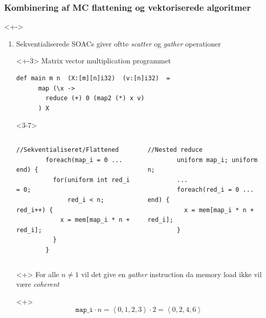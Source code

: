 \documentclass[t]{beamer}
\begin{document}
\begin{frame}[fragile]
  \frametitle{Kombinering af MC flattening og vektoriserede algoritmer}
  <+->
  \begin{enumerate}
    \item<+-> Sekventialiserede SOACs giver oftte \textit{scatter} og \textit{gather} operationer\\
      \begin{onlyenv}<+-3>
        Matrix vector multiplication programmet
        \begin{lstlisting}[language=futhark]
    def main m n  (X:[m][n]i32)  (v:[n]i32)  =
      map (\x ->
        reduce (+) 0 (map2 (*) x v)
      ) X
\end{lstlisting}
      \end{onlyenv}
      \begin{onlyenv}<3-7>
      \begin{columns}
        \begin{column}{0.49\textwidth}
        \begin{lstlisting}[language=ispc, xleftmargin=-15mm, breaklines=false]
        //Sekventialiseret/Flattened
        foreach(map_i = 0 ... end) {
          for(uniform int red_i = 0;
              red_i < n; red_i++) {
            x = mem[map_i * n + red_i];
          }
        }
\end{lstlisting}
        \end{column}
        \begin{column}{0.49\textwidth}
        \begin{lstlisting}[language=ispc, xleftmargin=-15mm, breaklines=false]
        //Nested reduce
        uniform map_i; uniform n;
        ...
        foreach(red_i = 0 ... end) {
          x = mem[map_i * n + red_i];
        }
\end{lstlisting}
          \end{column}
        \end{columns}
      \end{onlyenv}
  \begin{onlyenv}<+>
    For alle $n \neq 1$ vil det give en \textit{gather} instruction da memory load ikke vil være \textit{coherent}
  \end{onlyenv}
  \begin{onlyenv}<+>
    $$
    \texttt{map\_i} \cdot n =\left<0, 1, 2, 3 \right> \cdot 2 = \left<0,2,4,6\right>
    $$
  \end{onlyenv}


\end{enumerate}
\end{frame}
\end{document}
